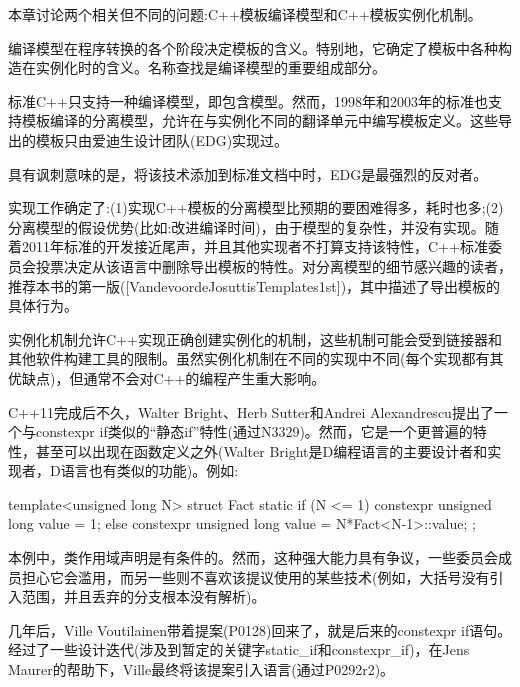 本章讨论两个相关但不同的问题:C++模板编译模型和C++模板实例化机制。

编译模型在程序转换的各个阶段决定模板的含义。特别地，它确定了模板中各种构造在实例化时的含义。名称查找是编译模型的重要组成部分。

标准C++只支持一种编译模型，即包含模型。然而，1998年和2003年的标准也支持模板编译的分离模型，允许在与实例化不同的翻译单元中编写模板定义。这些导出的模板只由爱迪生设计团队(EDG)实现过。

\begin{notice}具有讽刺意味的是，将该技术添加到标准文档中时，EDG是最强烈的反对者。
\end{notice}

实现工作确定了:(1)实现C++模板的分离模型比预期的要困难得多，耗时也多;(2)分离模型的假设优势(比如:改进编译时间)，由于模型的复杂性，并没有实现。随着2011年标准的开发接近尾声，并且其他实现者不打算支持该特性，C++标准委员会投票决定从该语言中删除导出模板的特性。对分离模型的细节感兴趣的读者，推荐本书的第一版([VandevoordeJosuttisTemplates1st])，其中描述了导出模板的具体行为。

实例化机制允许C++实现正确创建实例化的机制，这些机制可能会受到链接器和其他软件构建工具的限制。虽然实例化机制在不同的实现中不同(每个实现都有其优缺点)，但通常不会对C++的编程产生重大影响。

C++11完成后不久，Walter Bright、Herb Sutter和Andrei Alexandrescu提出了一个与constexpr if类似的“静态if”特性(通过N3329)。然而，它是一个更普遍的特性，甚至可以出现在函数定义之外(Walter Bright是D编程语言的主要设计者和实现者，D语言也有类似的功能)。例如:

\begin{cpp}
template<unsigned long N>
struct Fact {
	static if (N <= 1) {
		constexpr unsigned long value = 1;
	} else {
		constexpr unsigned long value = N*Fact<N-1>::value;
	}
};
\end{cpp}

本例中，类作用域声明是有条件的。然而，这种强大能力具有争议，一些委员会成员担心它会滥用，而另一些则不喜欢该提议使用的某些技术(例如，大括号没有引入范围，并且丢弃的分支根本没有解析)。

几年后，Ville Voutilainen带着提案(P0128)回来了，就是后来的constexpr if语句。经过了一些设计迭代(涉及到暂定的关键字static\_if和constexpr\_if)，在Jens Maurer的帮助下，Ville最终将该提案引入语言(通过P0292r2)。



